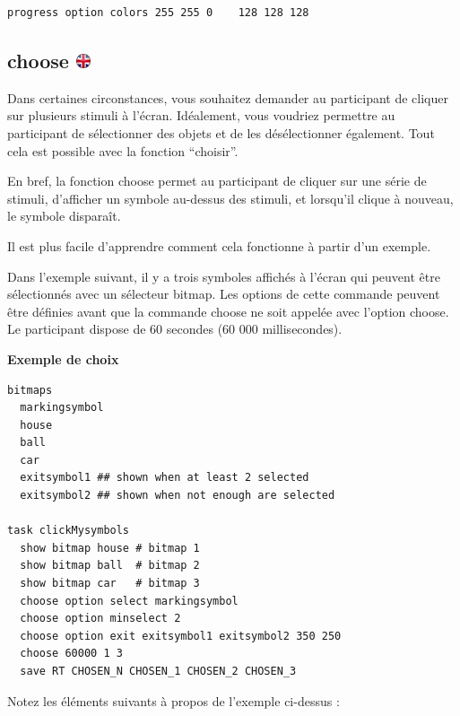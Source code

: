 \documentclass[
]{book}
\begin{document}
\begin{verbatim}
progress option colors 255 255 0    128 128 128
\end{verbatim}

\hypertarget{choose}{%
\subsection[choose ]{\texorpdfstring{choose \href{https://www.psytoolkit.org/doc3.2.0/syntax.html\#task-choose}{\protect\includegraphics{img/ukflag.png}}}{choose }}\label{choose}}

Dans certaines circonstances, vous souhaitez demander au participant de cliquer sur plusieurs stimuli à l'écran. Idéalement, vous voudriez permettre au participant de sélectionner des objets et de les désélectionner également. Tout cela est possible avec la fonction ``choisir''.

En bref, la fonction choose permet au participant de cliquer sur une série de stimuli, d'afficher un symbole au-dessus des stimuli, et lorsqu'il clique à nouveau, le symbole disparaît.

Il est plus facile d'apprendre comment cela fonctionne à partir d'un exemple.

Dans l'exemple suivant, il y a trois symboles affichés à l'écran qui peuvent être sélectionnés avec un sélecteur bitmap. Les options de cette commande peuvent être définies avant que la commande choose ne soit appelée avec l'option choose. Le participant dispose de 60 secondes (60 000 millisecondes).

\textbf{Exemple de choix}

\begin{verbatim}
bitmaps
  markingsymbol
  house
  ball
  car
  exitsymbol1 ## shown when at least 2 selected
  exitsymbol2 ## shown when not enough are selected

task clickMysymbols
  show bitmap house # bitmap 1
  show bitmap ball  # bitmap 2
  show bitmap car   # bitmap 3
  choose option select markingsymbol
  choose option minselect 2
  choose option exit exitsymbol1 exitsymbol2 350 250
  choose 60000 1 3
  save RT CHOSEN_N CHOSEN_1 CHOSEN_2 CHOSEN_3
\end{verbatim}

Notez les éléments suivants à propos de l'exemple ci-dessus :
\end{document}
